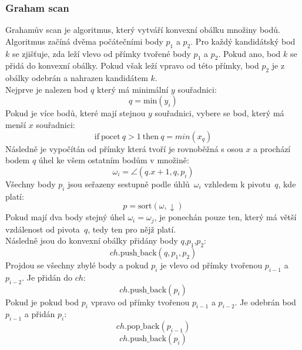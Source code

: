 \subsubsection{Graham scan}
Grahamův scan je algoritmus, který vytváří konvexní obálku množiny bodů. Algoritmus začíná dvěma počátečními body $p_1$ a $p_2$. Pro každý kandidátský bod $k$ se zjišťuje, zda leží vlevo od přímky tvořené body $p_1$ a $p_2$. Pokud ano, bod $k$ se přidá do konvexní obálky. Pokud však leží vpravo od této přímky, bod $p_2$ je z obálky odebrán a nahrazen kandidátem $k$.\\

\hspace{-1.15cm}
Nejprve je nalezen bod $q$ který má minimální $y$ souřadnici: 
\begin{equation}
    q = \text{min}(y_i)
\end{equation}
Pokud je více bodů, které mají stejnou $y$ souřadnici, vybere se bod, který má menší $x$ souřadnici:
\begin{equation}
    \text{if}~\text{pocet}~q>1~\text{then}~q = {min}(x_q)
\end{equation}
Následně je vypočítán od přímky která tvoří je rovnoběžná s osou $x$ a prochází bodem $q$ úhel ke všem ostatním bodům v množině:
\begin{equation}
    \omega _i = \angle( q.x+1,q,p_i)
\end{equation}
Všechny body $p_i$ jsou seřazeny sestupně podle úhlů~$\omega_i$ vzhledem k pivotu~$q$, kde platí:
\begin{equation}
    p = \text{sort}(\omega,\downarrow)
\end{equation}
Pokud mají dva body stejný úhel $\omega_i = \omega_j$, je ponechán pouze ten, který má větší vzdálenost od pivota~$q$, tedy ten pro nějž platí.\\
Následně jsou do konvexní obálky přidány body $q$,$p_1$,$p_2$:
\begin{equation}
    ch.\text{push\_back}(q,p_1,p_2)
\end{equation}
Projdou se všechny zbylé body a pokud $p_{i}$ je vlevo od přímky tvořenou $p_{i-1}$ a $p_{i-2}$. Je přidán do $ch$:
\begin{equation}
    ch.\text{push\_back}(p_{i})
\end{equation}
Pokud je pokud bod $p_{i}$ vpravo od přímky tvořenou $p_{i-1}$ a $p_{i-2}$. Je odebrán bod $p_{i-1}$ a přidán $p_{i}$:
\begin{equation}
    ch.\text{pop\_back}(p_{i-1})
\end{equation}
\begin{equation}
    ch.\text{push\_back}(p_{i})
\end{equation}


